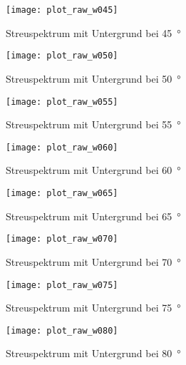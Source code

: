 \documentclass[11pt, ngerman, fleqn, DIV=15, headinclude, BCOR=2cm]{scrreprt}
\begin{document}
\begin{appendix}
\begin{figure}[h]
    \centering
    \texttt{[image: plot\_raw\_w045]}
    \caption{%
	    Streuspektrum mit Untergrund bei \SI{45}{\degree}
    }
    \label{fig:plot_raw_w045}
\end{figure}

\begin{figure}[h]
    \centering
    \texttt{[image: plot\_raw\_w050]}
    \caption{%
	    Streuspektrum mit Untergrund bei \SI{50}{\degree}
    }
    \label{fig:plot_raw_w050}
\end{figure}

\begin{figure}[h]
    \centering
    \texttt{[image: plot\_raw\_w055]}
    \caption{%
	    Streuspektrum mit Untergrund bei \SI{55}{\degree}
    }
    \label{fig:plot_raw_w055}
\end{figure}

\begin{figure}[h]
    \centering
    \texttt{[image: plot\_raw\_w060]}
    \caption{%
	    Streuspektrum mit Untergrund bei \SI{60}{\degree}
    }
    \label{fig:plot_raw_w060}
\end{figure}

\begin{figure}[h]
    \centering
    \texttt{[image: plot\_raw\_w065]}
    \caption{%
	    Streuspektrum mit Untergrund bei \SI{65}{\degree}
    }
    \label{fig:plot_raw_w065}
\end{figure}

\begin{figure}[h]
    \centering
    \texttt{[image: plot\_raw\_w070]}
    \caption{%
	    Streuspektrum mit Untergrund bei \SI{70}{\degree}
    }
    \label{fig:plot_raw_w070}
\end{figure}

\begin{figure}[h]
    \centering
    \texttt{[image: plot\_raw\_w075]}
    \caption{%
	    Streuspektrum mit Untergrund bei \SI{75}{\degree}
    }
    \label{fig:plot_raw_w075}
\end{figure}

\begin{figure}[h]
    \centering
    \texttt{[image: plot\_raw\_w080]}
    \caption{%
	    Streuspektrum mit Untergrund bei \SI{80}{\degree}
    }
    \label{fig:plot_raw_w080}
\end{figure}


\end{appendix}
\end{document}
